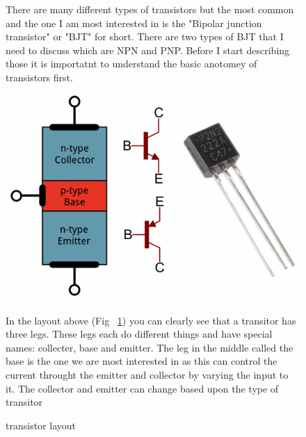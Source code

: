 \documentclass{article}
\begin{document}
\begin{figure}
    There are many different types of transistors but the most common and the one I am most interested in is
    the "Bipolar junction transistor" or "BJT" for short. There are two types of BJT that I need to discuss
    which are NPN and PNP. Before I start describing those it is importatnt to understand the basic anotomey
    of transistors first.

    \includegraphics{pictures/transistor-layout.png}
    \caption{transistor layout} \label{fig:transistor-layout}
    \vspace{0.5cm}

    In the layout above (Fig ~\ref{fig:transistor-layout}) you can clearly see that a transitor has three legs.
    These legs each do different things and have special names: collecter, base and emitter. The leg in the middle
    called the base is the one we are most interested in as this can control the current throught the emitter and
    collector by varying the input to it. The collector and emitter can change based upon the type of transitor

\end{figure}
\end{document}
